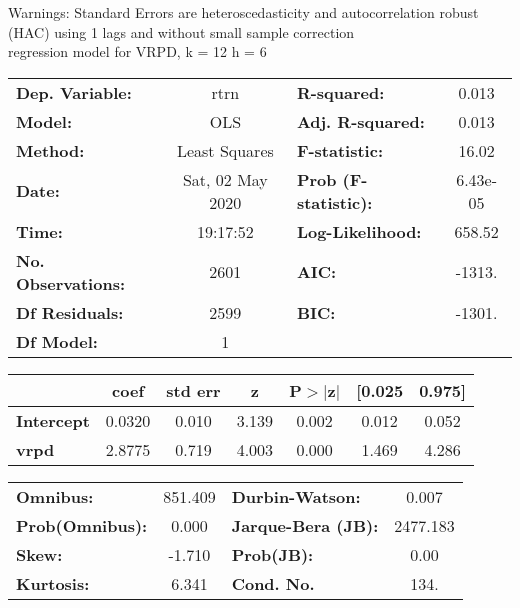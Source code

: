 Warnings: \newline
 [1] Standard Errors are heteroscedasticity and autocorrelation robust (HAC) using 1 lags and without small sample correction\\ 

regression model for VRPD, k = 12 h = 6\begin{center}
\begin{tabular}{lclc}
\toprule
\textbf{Dep. Variable:}    &       rtrn       & \textbf{  R-squared:         } &     0.013   \\
\textbf{Model:}            &       OLS        & \textbf{  Adj. R-squared:    } &     0.013   \\
\textbf{Method:}           &  Least Squares   & \textbf{  F-statistic:       } &     16.02   \\
\textbf{Date:}             & Sat, 02 May 2020 & \textbf{  Prob (F-statistic):} &  6.43e-05   \\
\textbf{Time:}             &     19:17:52     & \textbf{  Log-Likelihood:    } &    658.52   \\
\textbf{No. Observations:} &        2601      & \textbf{  AIC:               } &    -1313.   \\
\textbf{Df Residuals:}     &        2599      & \textbf{  BIC:               } &    -1301.   \\
\textbf{Df Model:}         &           1      & \textbf{                     } &             \\
\bottomrule
\end{tabular}
\begin{tabular}{lcccccc}
                   & \textbf{coef} & \textbf{std err} & \textbf{z} & \textbf{P$> |$z$|$} & \textbf{[0.025} & \textbf{0.975]}  \\
\midrule
\textbf{Intercept} &       0.0320  &        0.010     &     3.139  &         0.002        &        0.012    &        0.052     \\
\textbf{vrpd}      &       2.8775  &        0.719     &     4.003  &         0.000        &        1.469    &        4.286     \\
\bottomrule
\end{tabular}
\begin{tabular}{lclc}
\textbf{Omnibus:}       & 851.409 & \textbf{  Durbin-Watson:     } &    0.007  \\
\textbf{Prob(Omnibus):} &   0.000 & \textbf{  Jarque-Bera (JB):  } & 2477.183  \\
\textbf{Skew:}          &  -1.710 & \textbf{  Prob(JB):          } &     0.00  \\
\textbf{Kurtosis:}      &   6.341 & \textbf{  Cond. No.          } &     134.  \\
\bottomrule
\end{tabular}
\end{center}

